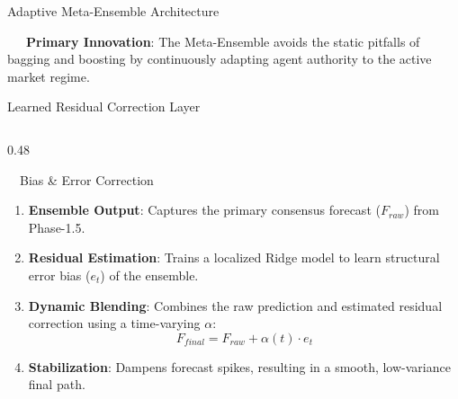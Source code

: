 \documentclass{beamer}
\begin{document}
\begin{frame}{Adaptive Meta-Ensemble Architecture}
\vspace{0.12cm}
\begin{tcolorbox}[enhanced, colback=accentTeal!4, colframe=accentTeal!40, boxrule=0.4pt,
  arc=4pt, width=0.98\textwidth, left=6pt, right=6pt, top=2.5pt, bottom=2.5pt, boxsep=0pt,
  shadow={0.5pt}{-0.5pt}{0pt}{black!8}]
    \fontsize{5.5pt}{6.5pt}\selectfont
    \textcolor{primaryDark}{~~~\textbf{Primary Innovation}: The Meta-Ensemble avoids the static pitfalls of bagging and boosting by continuously adapting agent authority to the active market regime.}
\end{tcolorbox}
\end{frame}

\begin{frame}{Learned Residual Correction Layer}
\vspace{-0.2cm}

\begin{columns}[T]
    \begin{column}{0.48\textwidth}
        \begin{infocard}{~~Bias \& Error Correction}
            \fontsize{6.8pt}{8.5pt}\selectfont
            \begin{enumerate}\setlength\itemsep{3.5pt}\setlength\parskip{0pt}
                \item[\textbf{1.}] \textbf{Ensemble Output}: Captures the primary consensus forecast ($F_{raw}$) from Phase-1.5.
                \item[\textbf{2.}] \textbf{Residual Estimation}: Trains a localized Ridge model to learn structural error bias ($e_t$) of the ensemble.
                \item[\textbf{3.}] \textbf{Dynamic Blending}: Combines the raw prediction and estimated residual correction using a time-varying $\alpha$:
                \[ F_{final} = F_{raw} + \alpha(t) \cdot e_t \]
                \item[\textbf{4.}] \textbf{Stabilization}: Dampens forecast spikes, resulting in a smooth, low-variance final path.
            \end{enumerate}
        \end{infocard}
    \end{column}
    

\end{columns}
\end{frame}
\end{document}
